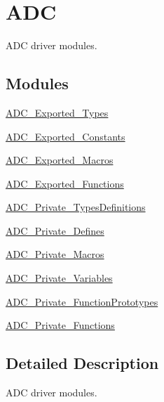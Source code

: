 \hypertarget{group___a_d_c}{}\section{A\+DC}
\label{group___a_d_c}


A\+DC driver modules.  


\subsection*{Modules}
\begin{DoxyCompactItemize}
\item 
\hyperlink{group___a_d_c___exported___types}{A\+D\+C\+\_\+\+Exported\+\_\+\+Types}
\item 
\hyperlink{group___a_d_c___exported___constants}{A\+D\+C\+\_\+\+Exported\+\_\+\+Constants}
\item 
\hyperlink{group___a_d_c___exported___macros}{A\+D\+C\+\_\+\+Exported\+\_\+\+Macros}
\item 
\hyperlink{group___a_d_c___exported___functions}{A\+D\+C\+\_\+\+Exported\+\_\+\+Functions}
\item 
\hyperlink{group___a_d_c___private___types_definitions}{A\+D\+C\+\_\+\+Private\+\_\+\+Types\+Definitions}
\item 
\hyperlink{group___a_d_c___private___defines}{A\+D\+C\+\_\+\+Private\+\_\+\+Defines}
\item 
\hyperlink{group___a_d_c___private___macros}{A\+D\+C\+\_\+\+Private\+\_\+\+Macros}
\item 
\hyperlink{group___a_d_c___private___variables}{A\+D\+C\+\_\+\+Private\+\_\+\+Variables}
\item 
\hyperlink{group___a_d_c___private___function_prototypes}{A\+D\+C\+\_\+\+Private\+\_\+\+Function\+Prototypes}
\item 
\hyperlink{group___a_d_c___private___functions}{A\+D\+C\+\_\+\+Private\+\_\+\+Functions}
\end{DoxyCompactItemize}


\subsection{Detailed Description}
A\+DC driver modules. 

